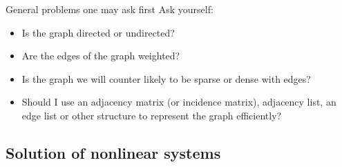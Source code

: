 \documentclass[xcolor=dvipsnames]{beamer}
\begin{document}
\begin{frame}{General problems one may ask first}
Ask yourself:
	\begin{itemize}
		\item Is the graph directed or undirected?
		\item Are the edges of the graph weighted?
		\item Is the graph we will counter likely to be sparse or dense with edges?
		\item Should I use an adjacency matrix (or incidence matrix), adjacency list, an edge list or other structure to represent the graph efficiently?
	\end{itemize}
\end{frame}


\subsection{Solution of nonlinear systems}
\end{document}
